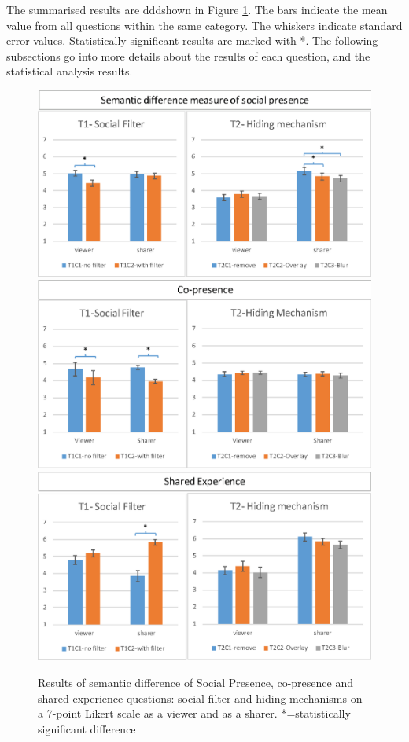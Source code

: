 The summarised results are dddshown in Figure \ref{fig:frontier18:result}. The bars indicate the mean value from all questions within the same category. The whiskers indicate standard error values. Statistically significant results are marked with *. The following subsections go into more details about the results of each question, and the statistical analysis results.

\begin{figure}
    \begin{center}
    \includegraphics[width=.8\linewidth]{images/54-hiding-frontier18/images-17.eps}
    \includegraphics[width=.8\linewidth]{images/54-hiding-frontier18/images-16.eps}
    \includegraphics[width=.8\linewidth]{images/54-hiding-frontier18/images-18.eps}
    \caption{Results of semantic difference of Social Presence, co-presence and shared-experience questions: social filter and hiding mechanisms on a 7-point Likert scale as a viewer and as a sharer. *=statistically significant difference}
    \label{fig:frontier18:result}
    \end{center}
\end{figure}


